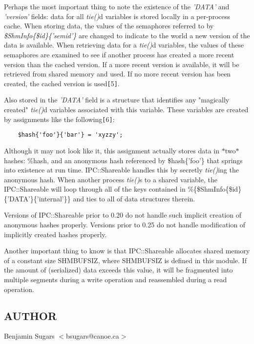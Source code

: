 Perhaps the most important thing to note the existence of the
{\em 'DATA'\/} and {\em 'version'\/} fields: data for all {\em tie()\/}d variables is
stored locally in a per-process cache.  When storing data, the values
of the semaphores referred to by {\em \$Shm\underscore{}Info\{\$id\}\{'sem\underscore{}id'\}\/} are
changed to indicate to the world a new version of the data is
available. When retrieving data for a {\em tie()\/}d variables, the values of
these semaphores are examined to see if another process has created a
more recent version than the cached version.  If a more recent version
is available, it will be retrieved from shared memory and used. If no
more recent version has been created, the cached version is used{\tt [}5{\tt ]}.

Also stored in the {\em 'DATA'\/} field is a structure that identifies any
"magically created" {\em tie()\/}d variables associated with this variable.
These variables are created by assignments like the following{\tt [}6{\tt ]}:
\begin{verbatim}
    $hash{'foo'}{'bar'} = 'xyzzy';
\end{verbatim}

Although it may not look like it, this assignment actually stores data
in $\ast$two$\ast$ hashes: \%hash, and an anonymous hash referenced by
\$hash\{'foo'\} that springs into existence at run time.  IPC::Shareable
handles this by secretly {\em tie()\/}ing the anonymous hash.  When another
process {\em tie()\/}s to a shared variable, the IPC::Shareable will loop
through all of the keys contained in
\%\{\$Shm\underscore{}Info\{\$id\}\{'DATA'\}\{'internal'\}\} and ties to all of data
structures therein.

Versions of IPC::Shareable prior to 0.20 do not handle such implicit
creation of anonymous hashes properly.  Versions prior to 0.25 do not
handle modification of implicitly created hashes properly.

Another important thing to know is that IPC::Shareable allocates
shared memory of a constant size SHM\underscore{}BUFSIZ, where SHM\underscore{}BUFSIZ is
defined in this module.  If the amount of (serialized) data exceeds
this value, it will be fragmented into multiple segments during a
write operation and reassembled during a read operation.

\subsection*{AUTHOR}
Benjamin Sugars $<$bsugars@canoe.ca$>$

